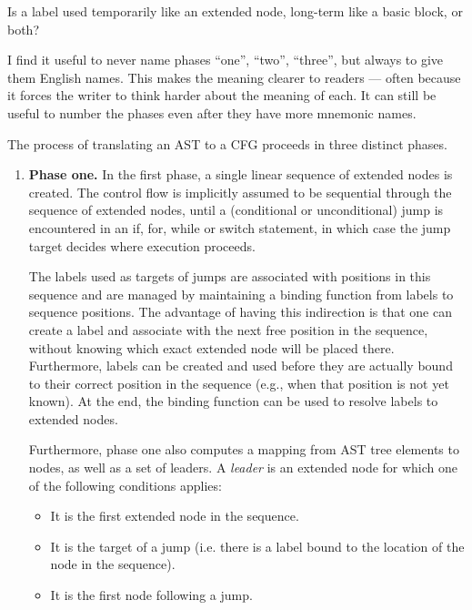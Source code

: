 \begin{workinprogress}
Is a label used temporarily like an extended node, long-term like a basic
block, or both?
\end{workinprogress}

\begin{workinprogress}
I find it useful to never name phases ``one'', ``two'', ``three'', but
always to give them English names.  This makes the meaning clearer to
readers --- often because it forces the writer to think harder about the
meaning of each.  It can still be useful to number the phases even after
they have more mnemonic names.
\end{workinprogress}


The process of translating an AST to a CFG proceeds in three distinct phases.
\begin{enumerate}
    \item \textbf{Phase one.} In the first phase, a single linear sequence of extended nodes is created. The control flow is implicitly
    assumed to be sequential through the sequence of extended nodes, until a (conditional
    or unconditional) jump is encountered in an if, for, while or switch statement, in which
    case the jump target decides where execution proceeds.
    
    The labels used as targets of jumps are associated with positions in this sequence and are managed
    by maintaining a binding function from labels to sequence positions. The advantage of
    having this indirection is that one can create a label and associate with the next free
    position in the sequence, without knowing which exact extended node will be placed there.
    Furthermore, labels can be created and used before they are actually bound to their correct
    position in the sequence (e.g., when that position is not yet known).
    At the end, the binding function can be used to resolve labels to
    extended nodes.
    
    Furthermore, phase one also computes a mapping from AST tree elements to nodes, as well
    as a set of leaders. A \emph{leader} is an extended node for which one of the following
    conditions applies:
    \begin{itemize}
    \item It is the first extended node in the sequence.
    \item It is the target of a jump (i.e. there is a label bound to the location of the node
    in the sequence).
    \item It is the first node following a jump.
    \end{itemize}
    

\end{enumerate}
